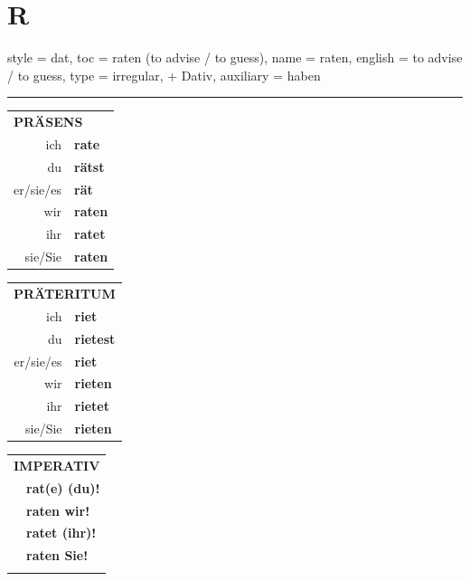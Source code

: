 \section{R}

\begin{verbentry}{
  style = {dat},
  toc = {raten (to advise / to guess)},
  name = {raten},
  english = {to advise / to guess},
  type = {irregular, + Dativ},
  auxiliary = {haben}
}
 
    
     \vspace{5pt}

    \hrule
    
    \vspace{5pt}

  \begin{tabular}{rl}
     \multicolumn{2}{l}{\textbf{PRÄSENS} }\\
    ich & \textbf{rate}\\
    du & \textbf{rätst}\\
    er/sie/es & \textbf{rät}\\
    wir & \textbf{raten}\\
    ihr & \textbf{ratet}\\
    sie/Sie & \textbf{raten}\\
  \end{tabular}
  \hfill
     \begin{tabular}{rl}
    \multicolumn{2}{l}{\textbf{PRÄTERITUM} }\\
    ich & \textbf{riet}\\
    du & \textbf{rietest}\\
    er/sie/es & \textbf{riet}\\
    wir & \textbf{rieten}\\
    ihr & \textbf{rietet}\\
    sie/Sie & \textbf{rieten}\\
  \end{tabular}
  \hfill
  \begin{tabular}{rl}
     \multicolumn{2}{l}{\textbf{IMPERATIV} }\\
   & \textbf{rat(e) (du)!}\\
   & \textbf{raten wir!}\\
   & \textbf{ratet (ihr)!}\\
   & \textbf{raten Sie!}\\
   & \vspace{10pt}
  \end{tabular}

    \vspace{10pt}


\end{verbentry}

